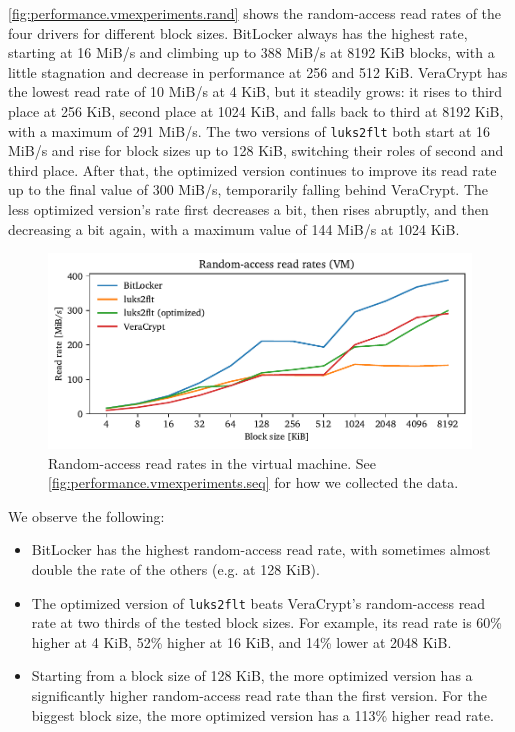 \autoref{fig:performance.vmexperiments.rand} shows the random-access read rates of the four drivers for different block sizes. BitLocker always has the highest rate, starting at 16 MiB/s and climbing up to 388 MiB/s at 8192 KiB blocks, with a little stagnation and decrease in performance at 256 and 512 KiB. VeraCrypt has the lowest read rate of 10 MiB/s at 4 KiB, but it steadily grows: it rises to third place at 256 KiB, second place at 1024 KiB, and falls back to third at 8192 KiB, with a maximum of 291 MiB/s. The two versions of \texttt{luks2flt} both start at 16 MiB/s and rise for block sizes up to 128 KiB, switching their roles of second and third place. After that, the optimized version continues to improve its read rate up to the final value of 300 MiB/s, temporarily falling behind VeraCrypt. The less optimized version's rate first decreases a bit, then rises abruptly, and then decreasing a bit again, with a maximum value of 144 MiB/s at 1024 KiB.

\begin{figure}[htb!]
	\center
	\includegraphics[scale=1]{../fig/performance.vmexperiments.rand.pdf}
	\caption[
		Random-access read rates in the virtual machine
	]{
		Random-access read rates in the virtual machine. See \autoref{fig:performance.vmexperiments.seq} for how we collected the data.
	}
	\label{fig:performance.vmexperiments.rand}
\end{figure}

We observe the following:
\begin{itemize}[beginpenalty=10000]
	\item BitLocker has the highest random-access read rate, with sometimes almost double the rate of the others (e.g. at 128 KiB).
	\item The optimized version of \texttt{luks2flt} beats VeraCrypt's random-access read rate at two thirds of the tested block sizes. For example, its read rate is 60\% higher at 4 KiB, 52\% higher at 16 KiB, and 14\% lower at 2048 KiB.
	\item Starting from a block size of 128 KiB, the more optimized version has a significantly higher random-access read rate than the first version. For the biggest block size, the more optimized version has a 113\% higher read rate.
\end{itemize}

